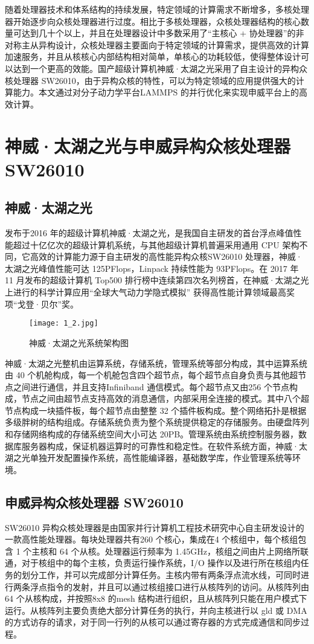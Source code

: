 随着处理器技术和体系结构的持续发展，特定领域的计算需求不断增多，多核处理器开始逐步向众核处理器进行过度。相比于多核处理器，众核处理器结构的核心数量可达到几十个以上，并且在处理器设计中多数采用了“主核心 + 协处理器”的非对称主从异构设计，众核处理器主要面向于特定领域的计算需求，提供高效的计算加速服务，并且从核核心内部结构相对简单，单核心的功耗较低，使得整体设计可以达到一个更高的效能。国产超级计算机神威·太湖之光采用了自主设计的异构众核处理器 SW26010，由于异构众核的特性，可以为特定领域的应用提供强大的计算能力。本文通过对分子动力学平台LAMMPS 的并行优化来实现申威平台上的高效计算。
\section{神威·太湖之光与申威异构众核处理器 SW26010}
\subsection{神威·太湖之光}
发布于2016 年的超级计算机神威·太湖之光\cite{fu2016sunway}，是我国自主研发的首台浮点峰值性能超过十亿亿次的超级计算机系统，与其他超级计算机普遍采用通用 CPU 架构不同，它高效的计算能力源于自主研发的高性能异构众核SW26010 处理器，神威·太湖之光峰值性能可达 125PFlops，Linpack 持续性能为 93PFlops。在 2017 年 11 月发布的超级计算机 Top500 排行榜中连续第四次名列榜首，在神威·太湖之光上进行的科学计算应用“全球大气动力学隐式模拟”\cite{yang201610m} 获得高性能计算领域最高奖项“戈登·贝尔”奖。

 \begin{figure}[h]
  \centering
  \texttt{[image: 1\_2.jpg]}
  \caption{神威·太湖之光系统架构图}
\end{figure}

神威·太湖之光整机由运算系统，存储系统，管理系统等部分构成\cite{dongarra2016report}，其中运算系统由 40 个机舱构成，每一个机舱包含四个超节点，每个超节点自身负责与其他超节点之间进行通信，并且支持Infiniband 通信模式。每个超节点又由256 个节点构成，节点之间由超节点支持高效的消息通信，内部采用全连接的模式。其中八个超节点构成一块插件板，每个超节点由整整 32 个插件板构成。整个网络拓扑是根据多级胖树的结构组成。存储系统负责为整个系统提供稳定的存储服务。由硬盘阵列和存储网络构成的存储系统空间大小可达 20PB。管理系统由系统控制服务器，数据库服务器构成，保证机器运算时的可靠性和稳定性。在软件系统方面，神威·太湖之光单独开发配置操作系统，高性能编译器，基础数学库，作业管理系统等环境。
\subsection{申威异构众核处理器 SW26010}
SW26010 异构众核处理器是由国家并行计算机工程技术研究中心自主研发设计的一款高性能处理器\cite{lin2018evaluating}。每块处理器共有260 个核心，集成在4 个核组中，每个核组包含 1 个主核和 64 个从核。处理器运行频率为 1.45GHz，核组之间由片上网络所联通，对于核组中的每个主核，负责运行操作系统，I/O 操作以及进行所在核组内任务的划分工作，并可以完成部分计算任务。主核内带有两条浮点流水线，可同时进行两条浮点指令的发射，并且可以通过核组接口进行从核阵列的访问。从核阵列由64 个从核构成，并按照8x8 的mesh 结构进行组织，且从核阵列只能在用户模式下运行。从核阵列主要负责绝大部分计算任务的执行，并向主核进行以 gld 或 DMA 的方式访存的请求，对于同一行列的从核可以通过寄存器的方式完成通信和同步过程。

